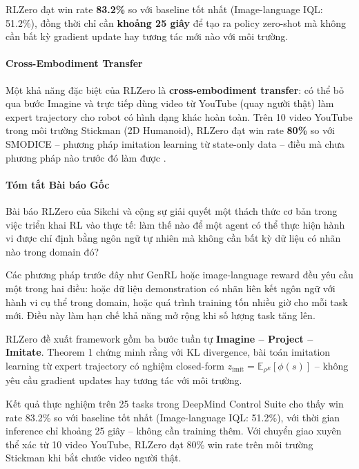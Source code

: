 RLZero đạt win rate \textbf{83.2\%} so với baseline tốt nhất
(Image-language IQL: 51.2\%), đồng thời chỉ cần \textbf{khoảng 25 giây}
\cite{sikchi2025rlzero} để tạo ra policy zero-shot mà không cần bất kỳ
gradient update hay tương tác mới nào với môi trường.

\paragraph{Cross-Embodiment Transfer}

Một khả năng đặc biệt của RLZero là \textbf{cross-embodiment
transfer}: có thể bỏ qua bước Imagine và trực tiếp dùng video từ
YouTube (quay người thật) làm expert trajectory cho robot có hình dạng
khác hoàn toàn. Trên 10 video YouTube trong môi trường Stickman
(2D Humanoid), RLZero đạt win rate \textbf{80\%} so với SMODICE --
phương pháp imitation learning từ state-only data -- điều mà chưa
phương pháp nào trước đó làm được \cite{sikchi2025rlzero}.

\paragraph{Tóm tắt Bài báo Gốc}

Bài báo RLZero của Sikchi và cộng sự \cite{sikchi2025rlzero} giải
quyết một thách thức cơ bản trong việc triển khai RL vào thực tế: làm
thế nào để một agent có thể thực hiện hành vi được chỉ định bằng ngôn
ngữ tự nhiên mà không cần bất kỳ dữ liệu có nhãn nào trong domain đó?

Các phương pháp trước đây như GenRL hoặc image-language reward đều yêu
cầu một trong hai điều: hoặc dữ liệu demonstration có nhãn liên kết
ngôn ngữ với hành vi cụ thể trong domain, hoặc quá trình training tốn
nhiều giờ cho mỗi task mới. Điều này làm hạn chế khả năng mở rộng khi
số lượng task tăng lên.

RLZero đề xuất framework gồm ba bước tuần tự \textbf{Imagine --
Project -- Imitate}. Theorem 1 chứng minh rằng với KL divergence,
bài toán imitation learning từ expert trajectory có nghiệm closed-form
$z_{\text{imit}} = \mathbb{E}_{\rho^E}[\phi(s)]$ -- không yêu cầu
gradient updates hay tương tác với môi trường.

Kết quả thực nghiệm trên 25 tasks trong DeepMind Control Suite cho
thấy win rate 83.2\% so với baseline tốt nhất (Image-language IQL:
51.2\%), với thời gian inference chỉ khoảng 25 giây -- không cần
training thêm. Với chuyển giao xuyên thể xác từ 10 video YouTube, RLZero
đạt 80\% win rate trên môi trường Stickman khi bắt chước video người thật.

